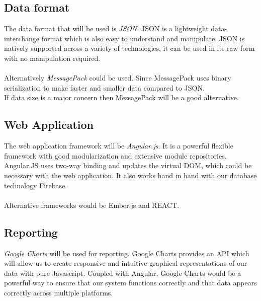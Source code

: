 \documentclass[paper=a4, fontsize=11pt]{scrartcl} %
\begin{document}
	\subsection{Data format}
	The data format that will be used is \textit{JSON}. JSON is a lightweight data-interchange format which is also easy to understand and	manipulate. JSON is natively supported across a variety of technologies, it can be used in its raw form with no manipulation required.\\\\Alternatively \textit{MessagePack} could be used. Since MessagePack uses binary serialization to make faster and smaller data compared to JSON.\\
	If data size is a major concern then MessagePack will be a good alternative.
	
	\subsection{Web Application}
	The web application framework will be \textit{Angular.js}. It is a powerful flexible framework with good modularization and extensive module repositories. Angular.JS uses two-way binding and updates the virtual DOM, which could be necessary with the web application. It also works hand in hand with our database technology Firebase.\\
	\\Alternative frameworks would be Ember.js and REACT.
	
	\subsection{Reporting}
	\textit{Google Charts} will be used for reporting. Google Charts provides an API which will allow us to create responsive and intuitive graphical representations of our data with pure Javascript. Coupled with Angular, Google Charts would be a powerful way to ensure that our system functions correctly and that data appears correctly across multiple platforms.
	
\end{document}
